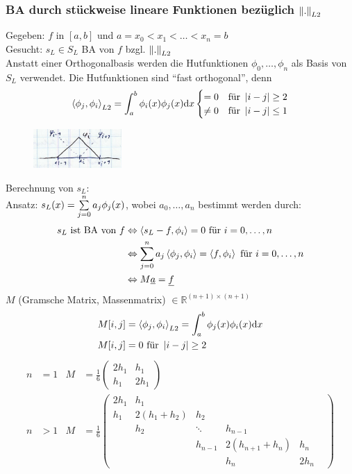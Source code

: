 \subsubsection{BA durch stückweise lineare Funktionen bezüglich $\left\lVert . \right\rVert_{L2}$}
Gegeben: $f$ in $[a,b]$ und $a=x_0<x_1<\ldots<x_n=b$\\
Gesucht: $s_L \in S_L$ BA von $f$ bzgl. $\left\lVert . \right\rVert_{L2}$\\
Anstatt einer Orthogonalbasis werden die Hutfunktionen $\phi_0,\ldots,\phi_n$ als Basis von $S_L$ verwendet.
Die Hutfunktionen sind ``fast orthogonal'', denn
\begin{align*}
  \left\langle \phi_j, \phi_i \right\rangle_{L2} = \int_a^b \phi_i(x)\phi_j(x)\mathrm{d}x\begin{cases}
    =0 &\mbox{für } \left| i-j \right| \geq 2\\
    \neq0 &\mbox{für } \left| i-j \right| \leq 1\\
  \end{cases}
\end{align*}
\begin{figure}[htbp]
  \centering
  \includegraphics[width=0.3\textwidth]{figures/hutfunktionen2.png}
  \label{Hutfunktionen}
\end{figure}
Berechnung von $s_L$:\\
Ansatz: $s_L(x)=\sum\limits_{j=0}^{n}{a_j \phi_j(x)}$, wobei $a_0,\ldots,a_n$ bestimmt werden durch:
\begin{align*}
  s_L \mbox{ ist BA von } f &\Leftrightarrow \left\langle s_L - f, \phi_i \right\rangle = 0 \mbox{ für } i=0,\ldots,n\\
  &\Leftrightarrow \sum\limits_{j=0}^{n}{a_j\left\langle \phi_j, \phi_i \right\rangle} = \left\langle f, \phi_i \right\rangle\mbox{ für } i=0,\ldots,n\\
  &\Leftrightarrow M \underline{a} = \underline{f}
\end{align*}
$M$ (Gramsche Matrix, Massenmatrix) $\in \mathbb{R}^{(n+1)\times(n+1)}$
\begin{align*}
  M[i,j] &= \left\langle \phi_j, \phi_i \right\rangle_{L2} = \int_a^b \phi_j(x)\phi_i(x) \mathrm{d}x\\
  M[i,j] &= 0 \mbox{ für } \left| i-j \right| \geq 2
\end{align*}
\begin{align*}
  n &= 1 & M &= \frac{1}{6}\begin{pmatrix}
    2h_1 & h_1\\
    h_1 & 2h_1
  \end{pmatrix}\\
  n &> 1 & M &= \frac{1}{6}\begin{pmatrix}
		      2 h_1   & h_1 &        &          & &  \\
					h_1     & 2(h_1+h_2)   & h_2      & &  \\
                  & h_2          & \ddots   & h_{n-1} & \\
                  &              &  h_{n-1} & 2(h_{n+1}+h_n)  & h_n \\
									&              &  & h_n   & 2 h_n
		      \end{pmatrix}
\end{align*}
